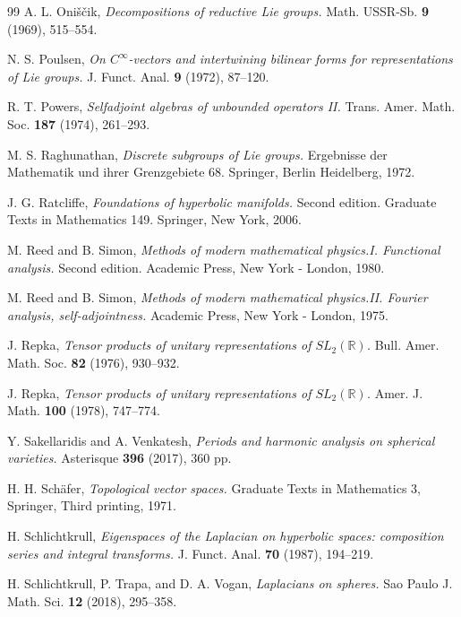 \documentclass[10]{amsart}
\theoremstyle{remark}
\theoremstyle{definition}
\numberwithin{equation}{section}
\begin{document}
{\begin{thebibliography}{99}
  A. L. Oni\v s\v cik, {\it Decompositions of reductive Lie groups.} Math. USSR-Sb. {\bf 9} (1969), 515--554.

  N. S. Poulsen, {\it On $C^\infty$-vectors and intertwining bilinear forms for representations of Lie groups.}  
J. Funct. Anal. {\bf 9} (1972), 87--120.

 R. T. Powers, {\it Selfadjoint algebras of unbounded operators II.}  
Trans. Amer. Math. Soc. {\bf 187} (1974), 261--293.

 M. S. Raghunathan, {\em Discrete subgroups of Lie groups.} Ergebnisse der Mathematik und ihrer Grenzgebiete 68. Springer, Berlin Heidelberg, 1972.

  J. G. Ratcliffe, {\it Foundations of hyperbolic manifolds.} 
 Second edition. Graduate Texts in Mathematics 149. Springer, New York, 2006.

  M. Reed and B. Simon, {\it Methods of modern mathematical physics.I. Functional analysis.} 
 Second edition. Academic Press, New York - London, 1980.

  M. Reed and B. Simon, {\it Methods of modern mathematical physics.II. Fourier analysis, self-adjointness.} 
Academic Press, New York - London, 1975.

 J. Repka, {\it Tensor products of unitary representations of $SL_2({\mathbb R})$.} Bull. Amer. Math. Soc. {\bf 82} (1976), 930--932.

 J. Repka, {\it Tensor products of unitary representations of $SL_2({\mathbb R})$.} Amer. J.  Math. {\bf 100} (1978), 747--774.


 Y. Sakellaridis and A. Venkatesh, {\it Periods and harmonic analysis on spherical varieties.} Asterisque {\bf 396} (2017), 360 pp.

 H. H. Sch\" afer, {\it Topological vector spaces.} Graduate Texts in Mathematics 3, Springer, Third printing, 1971.

 H. Schlichtkrull, {\it Eigenspaces of the Laplacian on hyperbolic spaces: composition series and integral transforms.} J. Funct. Anal. {\bf 70} (1987), 194--219.

 H. Schlichtkrull, P. Trapa, and D. A. Vogan, {\it Laplacians on spheres.} Sao Paulo J. Math. Sci. {\bf 12} (2018), 295--358.


\end{thebibliography}}
\end{document}
